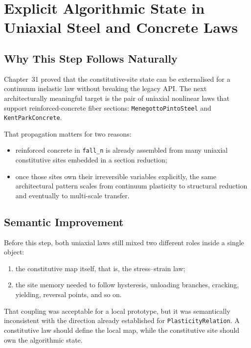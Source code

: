 \chapter{Explicit Algorithmic State in Uniaxial Steel and Concrete Laws}

\section{Why This Step Follows Naturally}

Chapter~31 proved that the constitutive-site state can be externalised for a
continuum inelastic law without breaking the legacy API.  The next
architecturally meaningful target is the pair of uniaxial nonlinear laws that
support reinforced-concrete fiber sections:
\texttt{MenegottoPintoSteel} and \texttt{KentParkConcrete}.

That propagation matters for two reasons:

\begin{itemize}
  \item reinforced concrete in \texttt{fall\_n} is already assembled from many
        uniaxial constitutive sites embedded in a section reduction;
  \item once those sites own their irreversible variables explicitly, the same
        architectural pattern scales from continuum plasticity to structural
        reduction and eventually to multi-scale transfer.
\end{itemize}

\section{Semantic Improvement}

Before this step, both uniaxial laws still mixed two different roles inside a
single object:

\begin{enumerate}
  \item the constitutive map itself, that is, the stress--strain law;
  \item the site memory needed to follow hysteresis, unloading branches,
        cracking, yielding, reversal points, and so on.
\end{enumerate}

That coupling was acceptable for a local prototype, but it was semantically
inconsistent with the direction already established for
\texttt{PlasticityRelation}.  A constitutive law should define the local map,
while the constitutive site should own the algorithmic state.

